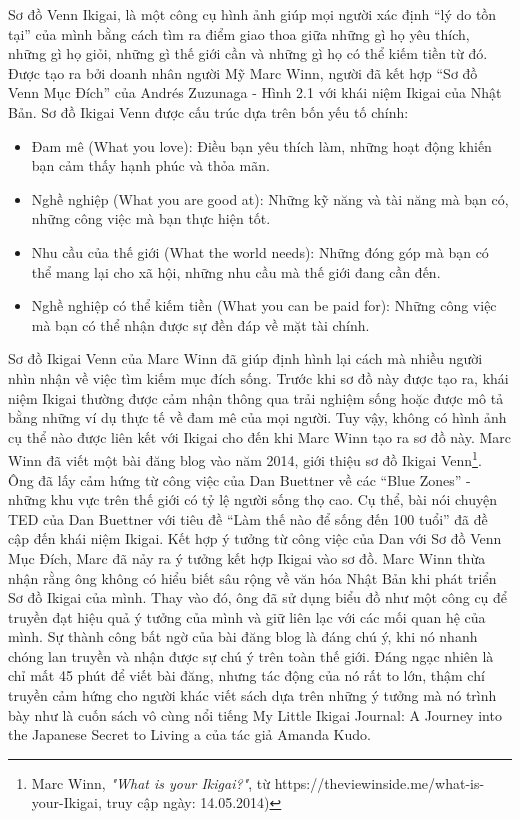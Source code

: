 Sơ đồ Venn Ikigai, là một công cụ hình ảnh giúp mọi người xác định “lý do tồn tại” của mình bằng cách tìm ra điểm giao thoa giữa những gì họ yêu thích, những gì họ giỏi, những gì thế giới cần và những gì họ có thể kiếm tiền từ đó. Được tạo ra bởi doanh nhân người Mỹ Marc Winn, người đã kết hợp “Sơ đồ Venn Mục Đích” của Andrés Zuzunaga - Hình 2.1 với khái niệm Ikigai của Nhật Bản. Sơ đồ Ikigai Venn được cấu trúc dựa trên bốn yếu tố chính:

\begin{itemize}
    \item Đam mê (What you love): Điều bạn yêu thích làm, những hoạt động khiến bạn cảm thấy hạnh phúc và thỏa mãn.
    \item Nghề nghiệp (What you are good at): Những kỹ năng và tài năng mà bạn có, những công việc mà bạn thực hiện tốt.
    \item Nhu cầu của thế giới (What the world needs): Những đóng góp mà bạn có thể mang lại cho xã hội, những nhu cầu mà thế giới đang cần đến.
    \item Nghề nghiệp có thể kiếm tiền (What you can be paid for): Những công việc mà bạn có thể nhận được sự đền đáp về mặt tài chính. 
\end{itemize}

Sơ đồ Ikigai Venn của Marc Winn đã giúp định hình lại cách mà nhiều người nhìn nhận về việc tìm kiếm mục đích sống. Trước khi sơ đồ này được tạo ra, khái niệm Ikigai thường được cảm nhận thông qua trải nghiệm sống hoặc được mô tả bằng những ví dụ thực tế về đam mê của mọi người. Tuy vậy, không có hình ảnh cụ thể nào được liên kết với Ikigai cho đến khi Marc Winn tạo ra sơ đồ này. Marc Winn đã viết một bài đăng blog vào năm 2014, giới thiệu sơ đồ Ikigai Venn\footnote{Marc Winn, \textit{"What is your Ikigai?"}, từ https://theviewinside.me/what-is-your-Ikigai, truy cập ngày: 14.05.2014)}. Ông đã lấy cảm hứng từ công việc của Dan Buettner về các “Blue Zones” - những khu vực trên thế giới có tỷ lệ người sống thọ cao. Cụ thể, bài nói chuyện TED của Dan Buettner với tiêu đề “Làm thế nào để sống đến 100 tuổi” đã đề cập đến khái niệm Ikigai. Kết hợp ý tưởng từ công việc của Dan với Sơ đồ Venn Mục Đích, Marc đã nảy ra ý tưởng kết hợp Ikigai vào sơ đồ. Marc Winn thừa nhận rằng ông không có hiểu biết sâu rộng về văn hóa Nhật Bản khi phát triển Sơ đồ Ikigai của mình. Thay vào đó, ông đã sử dụng biểu đồ như một công cụ để truyền đạt hiệu quả ý tưởng của mình và giữ liên lạc với các mối quan hệ của mình. Sự thành công bất ngờ của bài đăng blog là đáng chú ý, khi nó nhanh chóng lan truyền và nhận được sự chú ý trên toàn thế giới. Đáng ngạc nhiên là chỉ mất 45 phút để viết bài đăng, nhưng tác động của nó rất to lớn, thậm chí truyền cảm hứng cho người khác viết sách dựa trên những ý tưởng mà nó trình bày như là cuốn sách vô cùng nổi tiếng My Little Ikigai Journal: A Journey into the Japanese Secret to Living a của tác giả Amanda Kudo.

